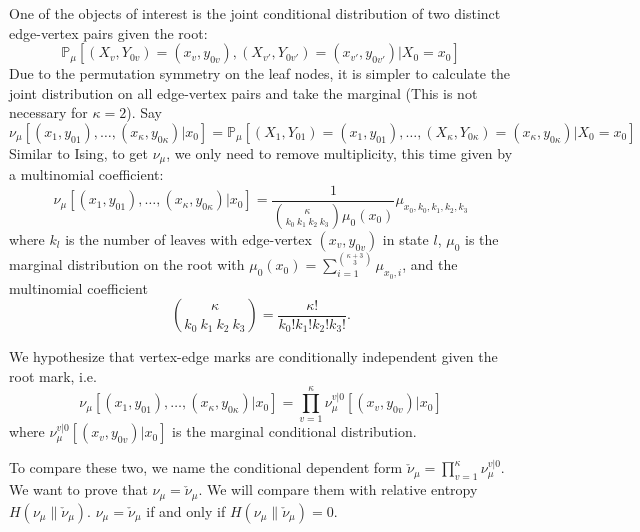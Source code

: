 \documentclass[12pt]{article}
\begin{document}
One of the objects of interest is the joint conditional distribution of two distinct edge-vertex pairs given the root:
\begin{equation*}
    \mathbb{P}_\mu\left[(X_v, Y_{0v}) = (x_v, y_{0v}), (X_{v'}, Y_{0v'}) = (x_{v'}, y_{0v'}) | X_0 = x_0\right]
\end{equation*}
Due to the permutation symmetry on the leaf nodes, it is simpler to calculate the joint distribution on all edge-vertex
pairs and take the marginal (This is not necessary for $\kappa=2$). Say
\begin{equation*}
    \nu_\mu[(x_1, y_{01}), \ldots, (x_\kappa, y_{0\kappa})| x_0] = \mathbb{P}_\mu\left[(X_1, Y_{01}) = (x_1, y_{01}), \ldots,  (X_{\kappa}, Y_{0\kappa}) = (x_{\kappa}, y_{0\kappa}) | X_0 = x_0\right]
\end{equation*}
Similar to Ising, to get $\nu_\mu$, we only need to remove multiplicity, this time given by a multinomial coefficient:
\begin{equation*}
    \nu_\mu[(x_1, y_{01}), \ldots, (x_\kappa, y_{0\kappa})| x_0] = \frac{1}{{\kappa \choose {k_0\ k_1\ k_2\ k_3}}\mu_0(x_0)}\mu_{x_0, k_0, k_1, k_2, k_3}
\end{equation*}
where $k_l$ is the number of leaves with edge-vertex $(x_v, y_{0v})$ in state $l$, $\mu_0$ is the marginal distribution on the root with $\mu_0(x_0) = \sum_{i=1}^{{\kappa+3\choose 3}} \mu_{x_0, i}$, and the multinomial coefficient
\begin{equation*}
    {\kappa \choose {k_0\ k_1\ k_2\ k_3}} = \frac{\kappa!}{k_0!k_1!k_2!k_3!}.
\end{equation*}

We hypothesize that vertex-edge marks are conditionally independent given the root mark, i.e.
\begin{equation*}
    \nu_\mu[(x_1, y_{01}), \ldots, (x_\kappa, y_{0\kappa})| x_0] = \prod_{v=1}^\kappa \nu_\mu^{v|0} [(x_v, y_{0v}) | x_0]
\end{equation*}
where $\nu_\mu^{v|0} [(x_v, y_{0v}) | x_0]$ is the marginal conditional distribution.

To compare these two, we name the conditional dependent form $\check{\nu}_\mu = \prod_{v=1}^\kappa \nu_\mu^{v|0}$. We want to prove that $\nu_\mu = \check{\nu}_\mu$. We will compare them with relative entropy $H(\nu_\mu \| \check{\nu}_\mu)$. $\nu_\mu = \check{\nu}_\mu$ if and only if $H(\nu_\mu \| \check{\nu}_\mu) = 0$.

\newpage
\end{document}
